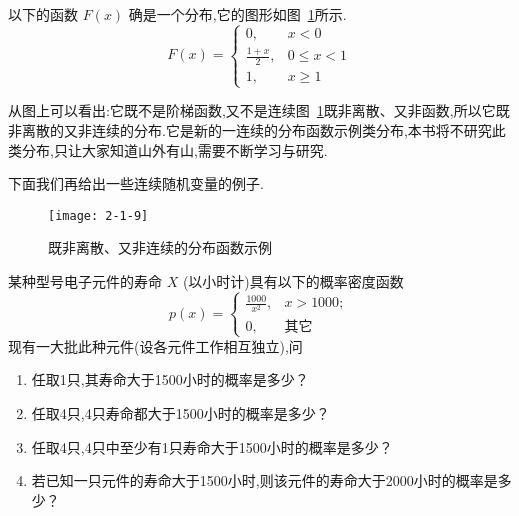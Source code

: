 \begin{example}
	以下的函数 $ F(x) $ 确是一个分布,它的图形如图~\ref{fig:2-1-9}所示.
	\[ 
	F(x)=\left\{\begin{array}{ll}{0,} & {x<0} \\ {\frac{1+x}{2},} & {0 \leqslant x<1} \\ {1,} & {x \geqslant 1}\end{array}\right.
	\]
	
	从图上可以看出:它既不是阶梯函数,又不是连续图~\ref{fig:2-1-9}既非离散、又非函数,所以它既非离散的又非连续的分布.它是新的一连续的分布函数示例类分布,本书将不研究此类分布,只让大家知道山外有山,需要不断学习与研究.
\end{example}

下面我们再给出一些连续随机变量的例子.

\begin{figure}
	\centering
	\texttt{[image: 2-1-9]}
	\caption{既非离散、又非连续的分布函数示例}
	\label{fig:2-1-9}
\end{figure}

\begin{example}
	某种型号电子元件的寿命 $ X $ (以小时计)具有以下的概率密度函数
	\[ 
	p(x)=\left\{\begin{array}{ll}
	\frac{1000}{x^{2}}, &x>1000;\\ 
	{0}, & \text{其它}
	\end{array}\right.
	\]
	现有一大批此种元件(设各元件工作相互独立),问
	
	\begin{enumerate}
		\item 任取1只,其寿命大于1500小时的概率是多少？
		\item 任取4只,4只寿命都大于1500小时的概率是多少？
		\item 任取4只,4只中至少有1只寿命大于1500小时的概率是多少？
		\item 若已知一只元件的寿命大于1500小时,则该元件的寿命大于2000小时的概率是多少？
	\end{enumerate}
\end{example}


